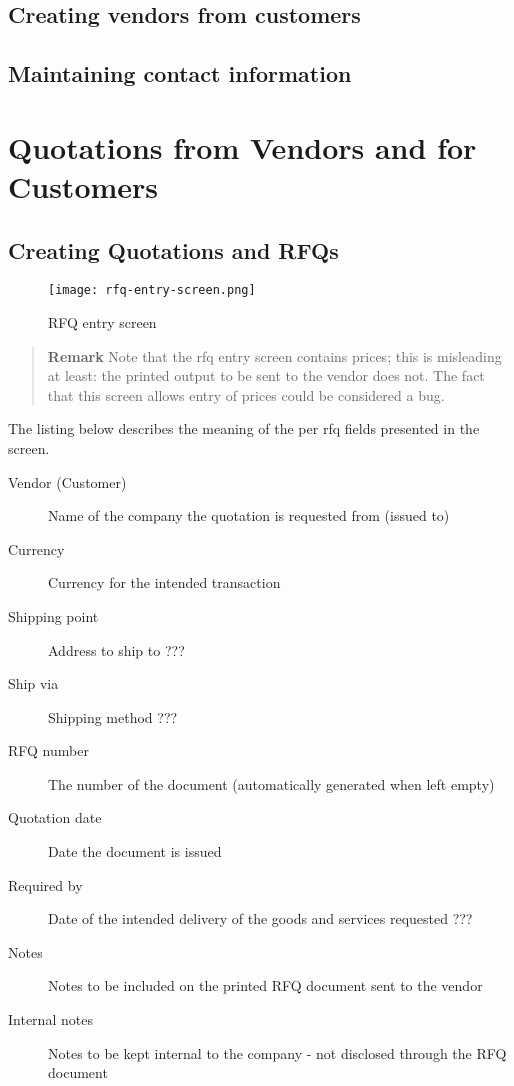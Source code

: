 \section{Creating vendors from customers}
\label{sec-workflows-customers-to-vendors}


\section{Maintaining contact information}


\chapter{Quotations from Vendors and for Customers}

\section{Creating Quotations and RFQs}
\label{sec:creating-quotations}


\begin{figure}[h]
\centering
\texttt{[image: rfq-entry-screen.png]}
\caption{RFQ entry screen}
\label{fig:rfq-entry-screen}
\end{figure}

\begin{quotation}
\textbf{Remark} Note that the \gls{rfq} entry screen contains prices; this is misleading
at least: the printed output to be sent to the vendor does not. The fact that this screen
allows entry of prices could be considered a bug.
\end{quotation}

The listing below describes the meaning of the per \gls{rfq} fields presented in the screen.

\begin{description}
\item [Vendor (Customer)] Name of the company the quotation is requested from (issued to)
\item [Currency] Currency for the intended transaction
\item [Shipping point] Address to ship to ??? %
\item [Ship via] Shipping method ???  %
\item [RFQ number] The number of the document (automatically generated when left empty)
\item [Quotation date] Date the document is issued
\item [Required by] Date of the intended delivery of the goods and services requested ??? %
\item [Notes] Notes to be included on the printed RFQ document sent to the vendor
\item [Internal notes] Notes to be kept internal to the company - not disclosed through the RFQ document
\end{description}

